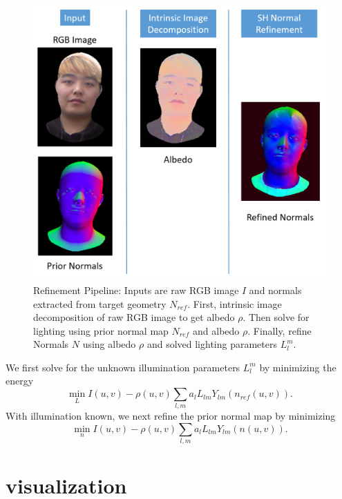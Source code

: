 \documentclass[10pt,twocolumn,letterpaper]{article}
\begin{document}
\begin{figure}[!h]
    \begin{center}
        \includegraphics [scale=0.25] {image/refine_pipeline.png}
    \end{center}
    \caption{Refinement Pipeline: Inputs are raw RGB image $I$ and normals extracted from target geometry $N_{ref}$. First, intrinsic image decomposition of raw RGB image to get albedo $\rho$. Then solve for lighting using prior normal map $N_{ref}$ and albedo $\rho$. Finally, refine Normals $N$ using albedo $\rho$ and solved lighting parameters $L_l^m$.}
    \label{fig:pipe2}
\end{figure} 
We first solve for the unknown illumination parameters $L_l^m$ by minimizing the energy
\begin{equation}
\min_{L} I(u,v) - \rho(u,v) \sum_{l,m} a_l L_{lm} Y_{lm}(n_{ref}(u,v)).
\end{equation}
With illumination known, we next refine the prior normal map by minimizing
\begin{equation}
\min_{n} I(u,v) - \rho(u,v) \sum_{l,m} a_l L_{lm} Y_{lm}(n(u,v)).
\end{equation}

\section{visualization}
    
\end{document}
